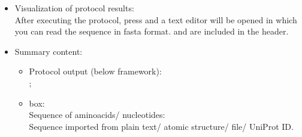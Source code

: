 \begin{itemize}
  \item Visualization of protocol results:\\
  
  After executing the protocol, press  and a text editor will be opened in which you can read the sequence in fasta format.  and  are included in the header.\\ 

 \item Summary content:\\
  \begin{itemize}
     \item Protocol output (below \scipion framework):\\ ; \\
     \item {} box:\\ Sequence of aminoacids/ nucleotides:\\Sequence {} imported from plain text/ atomic structure/ file/ UniProt ID.\\
    \end{itemize}

  \end{itemize}
